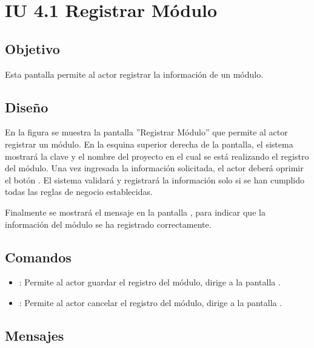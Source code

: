 \section{IU 4.1 Registrar Módulo}

\subsection{Objetivo}
	Esta pantalla permite al actor registrar la información de un módulo.
\subsection{Diseño}
	En la figura  se muestra la pantalla ''Registrar Módulo'' que permite al actor registrar un módulo. En la esquina superior derecha de la pantalla, el sistema mostrará la clave y el nombre del proyecto en el cual se está realizando el registro del módulo.
	Una vez ingresada la información solicitada, el actor deberá oprimir el botón  . El sistema validará y registrará la información solo si se han cumplido todas las reglas de negocio establecidas.
	
	Finalmente se mostrará el mensaje  en la pantalla , para indicar que la información del módulo se ha registrado correctamente.

\subsection{Comandos}
\begin{itemize}
	\item {}: Permite al actor guardar el registro del módulo, dirige a la pantalla .
	\item {}: Permite al actor cancelar el registro del módulo, dirige a la pantalla .
\end{itemize}

\subsection{Mensajes}

